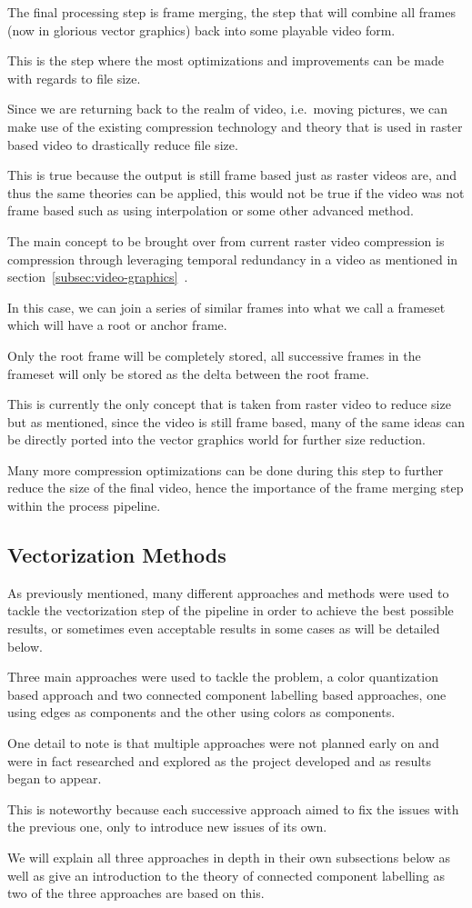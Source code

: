 \documentclass[12pt]{article}
\newcommand{\sentence}{} %
\newcommand{\fullref}[1]{\ref{#1}~\nameref{#1}}
\begin{document}
    \tab
    The final processing step is frame merging, the step that will combine all frames (now in glorious vector
    graphics) back into some playable video form.
    \sentence
    This is the step where the most optimizations and improvements can be made with regards to file size.
    \sentence
    Since we are returning back to the realm of video, i.e.\ moving pictures, we can make use of the existing
    compression technology and theory that is used in raster based video to drastically reduce file size.
    \sentence
    This is true because the output is still frame based just as raster videos are, and thus the same theories can be
    applied, this would not be true if the video was not frame based such as using interpolation or some other
    advanced method.
    \sentence
    The main concept to be brought over from current raster video compression is compression through leveraging
    temporal redundancy in a video as mentioned in section~\fullref{subsec:video-graphics}.
    \sentence
    In this case, we can join a series of similar frames into what we call a frameset which will have a root
    or anchor frame.
    \sentence
    Only the root frame will be completely stored, all successive frames in the frameset will only be stored as the
    delta between the root frame.
    \sentence
    This is currently the only concept that is taken from raster video to reduce size but as mentioned, since the
    video is still frame based, many of the same ideas can be directly ported into the vector graphics world for
    further size reduction.
    \sentence
    Many more compression optimizations can be done during this step to further reduce the size of the final
    video, hence the importance of the frame merging step within the process pipeline.

    \subsection{Vectorization Methods}\label{subsec:vectorization-methods}

    \tab
    As previously mentioned, many different approaches and methods were used to tackle the vectorization step of the
    pipeline in order to achieve the best possible results, or sometimes even acceptable results in some cases as
    will be detailed below.
    \sentence
    Three main approaches were used to tackle the problem, a color quantization based approach and two connected
    component labelling based approaches, one using edges as components and the other using colors as components.
    \sentence
    One detail to note is that multiple approaches were not planned early on and were in fact researched and explored
    as the project developed and as results began to appear.
    \sentence
    This is noteworthy because each successive approach aimed to fix the issues with the previous one, only to
    introduce new issues of its own.
    \sentence
    We will explain all three approaches in depth in their own subsections below as well as give an introduction to
    the theory of connected component labelling as two of the three approaches are based on this.
\end{document}
